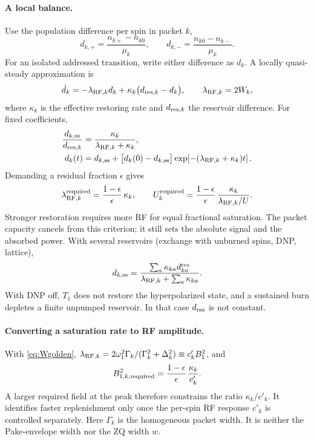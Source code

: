 \documentclass[11pt]{article}
\begin{document}
\paragraph{A local balance.}
Use the population difference per spin in packet \(k\),
\begin{equation}
  d_{k,+}=\frac{n_{k+}-n_{k0}}{\mu_k},
  \qquad
  d_{k,-}=\frac{n_{k0}-n_{k-}}{\mu_k}.
  \label{eq:pp-normalized-difference}
\end{equation}
For an isolated addressed transition, write either difference as \(d_k\). A locally quasi-steady
approximation is
\begin{equation}
  \dot d_k=-\lambda_{{\rm RF},k}d_k
  +\kappa_k\bigl(d_{{\rm res},k}-d_k\bigr),
  \qquad
  \lambda_{{\rm RF},k}=2W_k,
  \label{eq:pp-local-balance}
\end{equation}
where \(\kappa_k\) is the effective restoring rate and \(d_{{\rm res},k}\) the reservoir
difference. For fixed coefficients,
\begin{align}
  \frac{d_{k,\rm ss}}{d_{{\rm res},k}}
    &=\frac{\kappa_k}{\lambda_{{\rm RF},k}+\kappa_k},
    \label{eq:pp-steady-balance}\\
  d_k(t)&=d_{k,\rm ss}
    +\bigl[d_k(0)-d_{k,\rm ss}\bigr]
      \exp\!\left[-(\lambda_{{\rm RF},k}+\kappa_k)t\right].
    \label{eq:pp-finite-burn}
\end{align}
Demanding a residual fraction \(\epsilon\) gives
\begin{equation}
  \lambda_{{\rm RF},k}^{\rm required}
  =\frac{1-\epsilon}{\epsilon}\,\kappa_k,
  \qquad
  U_k^{\rm required}=\frac{1-\epsilon}{\epsilon}\,\frac{\kappa_k}{\lambda_{{\rm RF},k}/U}.
  \label{eq:pp-required-rate}
\end{equation}
Stronger restoration requires more RF for equal fractional saturation. The packet capacity
cancels from this criterion; it still sets the absolute signal and the absorbed power. With
several reservoirs (exchange with unburned spins, DNP, lattice),
\begin{equation}
  d_{k,\rm ss}
  =\frac{\sum_a\kappa_{ka}d_{ka}^{\rm res}}
  {\lambda_{{\rm RF},k}+\sum_a\kappa_{ka}}.
  \label{eq:pp-multiple-reservoirs}
\end{equation}
With DNP off, \(T_1\) does not restore the hyperpolarized state, and a sustained burn depletes a
finite unpumped reservoir. In that case \(d_{\rm res}\) is not constant.

\paragraph{Converting a saturation rate to RF amplitude.}
With \cref{eq:Wgolden},
\(\lambda_{{\rm RF},k}=2\omega_{1}^2\Gamma_k/(\Gamma_k^2+\Delta_k^2)\equiv c'_kB_{1}^2\), and
\begin{equation}
  B_{1,k,\rm required}^{2}
  =\frac{1-\epsilon}{\epsilon}\,\frac{\kappa_k}{c'_k}.
  \label{eq:pp-required-field}
\end{equation}
A larger required field at the peak therefore constrains the ratio \(\kappa_k/c'_k\). It
identifies faster replenishment only once the per-spin RF response \(c'_k\) is controlled
separately. Here \(\Gamma_k\) is the homogeneous packet width. It is neither the Pake-envelope
width nor the ZQ width \(w\).
\end{document}
